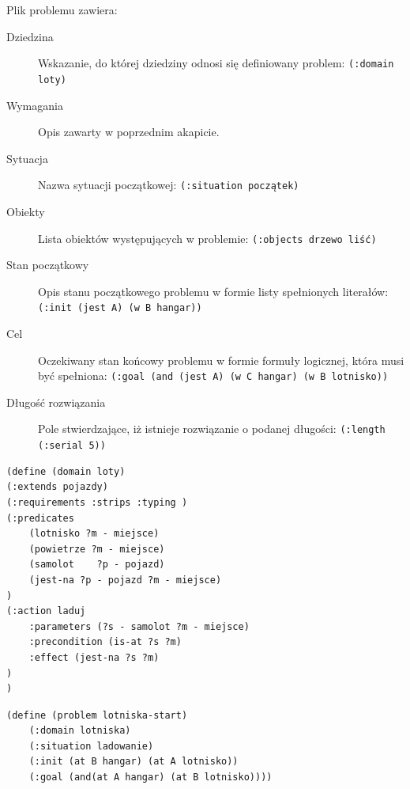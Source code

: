 Plik problemu zawiera:
\begin{description}
\item[Dziedzina] Wskazanie, do której dziedziny odnosi się definiowany problem: \texttt{(:domain loty)}
\item[Wymagania] Opis zawarty w poprzednim akapicie.
\item[Sytuacja] Nazwa sytuacji początkowej: \texttt{(:situation początek)}
\item[Obiekty] Lista obiektów występujących w problemie: \texttt{(:objects drzewo liść)}
\item[Stan początkowy] Opis stanu początkowego problemu w formie listy spełnionych literałów: \texttt{(:init (jest A) (w B hangar))}
\item[Cel] Oczekiwany stan końcowy problemu w formie formuły logicznej, która musi być spełniona: \texttt{(:goal (and (jest A) (w C hangar) (w B lotnisko))}
\item[Długość rozwiązania] Pole stwierdzające, iż istnieje rozwiązanie o podanej długości: \texttt{(:length (:serial 5))}
\end{description}
\begin{Code}
\begin{lstlisting}[language=LISP,frame=single,label=ana_code, caption=Zawartość przykładowego pliku dziedziny]
(define (domain loty)
(:extends pojazdy)
(:requirements :strips :typing )
(:predicates
	(lotnisko ?m - miejsce)
	(powietrze ?m - miejsce)
	(samolot	?p - pojazd)
	(jest-na ?p - pojazd ?m - miejsce)
)
(:action laduj
	:parameters (?s - samolot ?m - miejsce)
   	:precondition (is-at ?s ?m) 
	:effect (jest-na ?s ?m) 
)
)
\end{lstlisting}
\end{Code}

\begin{Code}
\begin{lstlisting}[language=LISP,frame=single,label=ana_code, caption=Zawartość przykładowego pliku problemu]
(define (problem lotniska-start)
	(:domain lotniska)
	(:situation ladowanie)
	(:init (at B hangar) (at A lotnisko))
	(:goal (and(at A hangar) (at B lotnisko))))
\end{lstlisting}
\end{Code}

